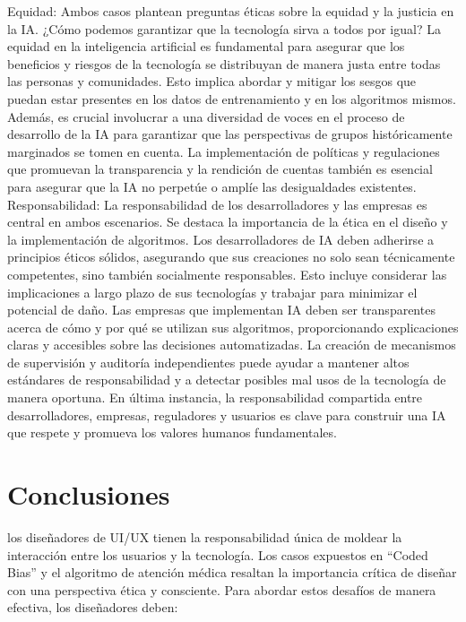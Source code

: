 \documentclass[conference]{IEEEtran}
\begin{document}
Equidad: Ambos casos plantean preguntas éticas sobre la equidad y la justicia en la IA. ¿Cómo podemos garantizar que la tecnología sirva a todos por igual? La equidad en la inteligencia artificial es fundamental para asegurar que los beneficios y riesgos de la tecnología se distribuyan de manera justa entre todas las personas y comunidades. Esto implica abordar y mitigar los sesgos que puedan estar presentes en los datos de entrenamiento y en los algoritmos mismos. Además, es crucial involucrar a una diversidad de voces en el proceso de desarrollo de la IA para garantizar que las perspectivas de grupos históricamente marginados se tomen en cuenta. La implementación de políticas y regulaciones que promuevan la transparencia y la rendición de cuentas también es esencial para asegurar que la IA no perpetúe o amplíe las desigualdades existentes.\\[12pt]
Responsabilidad:  La responsabilidad de los desarrolladores y las empresas es central en ambos escenarios. Se destaca la importancia de la ética en el diseño y la implementación de algoritmos. Los desarrolladores de IA deben adherirse a principios éticos sólidos, asegurando que sus creaciones no solo sean técnicamente competentes, sino también socialmente responsables. Esto incluye considerar las implicaciones a largo plazo de sus tecnologías y trabajar para minimizar el potencial de daño. Las empresas que implementan IA deben ser transparentes acerca de cómo y por qué se utilizan sus algoritmos, proporcionando explicaciones claras y accesibles sobre las decisiones automatizadas. La creación de mecanismos de supervisión y auditoría independientes puede ayudar a mantener altos estándares de responsabilidad y a detectar posibles mal usos de la tecnología de manera oportuna. En última instancia, la responsabilidad compartida entre desarrolladores, empresas, reguladores y usuarios es clave para construir una IA que respete y promueva los valores humanos fundamentales.



\section{Conclusiones}

los diseñadores de UI/UX tienen la responsabilidad única de moldear la interacción entre los usuarios y la tecnología. Los casos expuestos en “Coded Bias” y el algoritmo de atención médica resaltan la importancia crítica de diseñar con una perspectiva ética y consciente. Para abordar estos desafíos de manera efectiva, los diseñadores deben:\\
\end{document}
